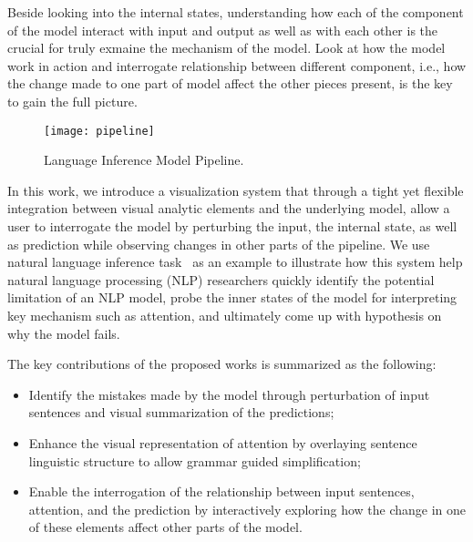 Beside looking into the internal states, understanding how each of the component of the model interact with input and output as well as with each other is the crucial for truly exmaine the mechanism of the model.
%
Look at how the model work in action and interrogate relationship between different component, i.e., how the change made to one part of model affect the other pieces present, is the key to gain the full picture.

\begin{figure}[htbp]
\centering
\vspace{-2mm}
 \texttt{[image: pipeline]}
 \caption{Language Inference Model Pipeline.}
\label{fig:projTransition}
\vspace{-5mm}
\end{figure}


In this work, we introduce a visualization system that through a tight yet flexible integration between visual analytic elements and the underlying model, allow a user to interrogate the model by perturbing the input, the internal state, as well as prediction while observing changes in other parts of the pipeline.
We use natural language inference task~\cite{BowmanAngeliPotts2015} as an example to illustrate how this system help natural language processing (NLP) researchers quickly identify the potential limitation of an NLP model, probe the inner states of the model for interpreting key mechanism such as attention, and ultimately come up with hypothesis on why the model fails.

%
%


The key contributions of the proposed works is summarized as the following:
\begin{itemize}
    \item Identify the mistakes made by the model through perturbation of input sentences and visual summarization of the predictions;

    \item Enhance the visual representation of attention by overlaying sentence linguistic structure to allow grammar guided simplification;

    \item Enable the interrogation of the relationship between input sentences, attention, and the prediction by interactively exploring how the change in one of these elements affect other parts of the model.

\end{itemize}
